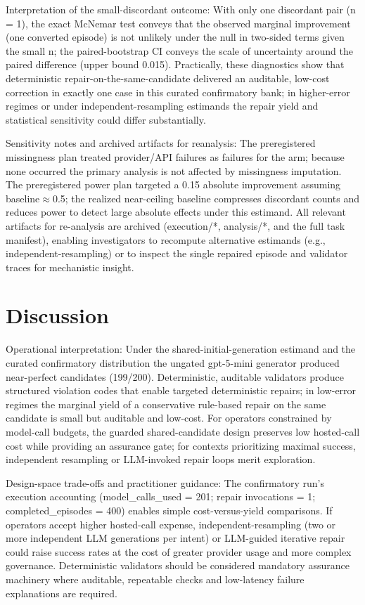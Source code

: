 \documentclass[conference]{IEEEtran}
\begin{document}
Interpretation of the small-discordant outcome: With only one discordant pair (n = 1), the exact McNemar test conveys that the observed marginal improvement (one converted episode) is not unlikely under the null in two-sided terms given the small n; the paired-bootstrap CI conveys the scale of uncertainty around the paired difference (upper bound 0.015). Practically, these diagnostics show that deterministic repair-on-the-same-candidate delivered an auditable, low-cost correction in exactly one case in this curated confirmatory bank; in higher-error regimes or under independent-resampling estimands the repair yield and statistical sensitivity could differ substantially.

Sensitivity notes and archived artifacts for reanalysis: The preregistered missingness plan treated provider/API failures as failures for the arm; because none occurred the primary analysis is not affected by missingness imputation. The preregistered power plan targeted a 0.15 absolute improvement assuming baseline\ensuremath{\approx}0.5; the realized near-ceiling baseline compresses discordant counts and reduces power to detect large absolute effects under this estimand. All relevant artifacts for re-analysis are archived (execution/*, analysis/*, and the full task manifest), enabling investigators to recompute alternative estimands (e.g., independent-resampling) or to inspect the single repaired episode and validator traces for mechanistic insight.

\section{Discussion}
Operational interpretation: Under the shared-initial-generation estimand and the curated confirmatory distribution the ungated gpt-5-mini generator produced near-perfect candidates (199/200). Deterministic, auditable validators produce structured violation codes that enable targeted deterministic repairs; in low-error regimes the marginal yield of a conservative rule-based repair on the same candidate is small but auditable and low-cost. For operators constrained by model-call budgets, the guarded shared-candidate design preserves low hosted-call cost while providing an assurance gate; for contexts prioritizing maximal success, independent resampling or LLM-invoked repair loops merit exploration.

Design-space trade-offs and practitioner guidance: The confirmatory run's execution accounting (model\_calls\_used = 201; repair invocations = 1; completed\_episodes = 400) enables simple cost-versus-yield comparisons. If operators accept higher hosted-call expense, independent-resampling (two or more independent LLM generations per intent) or LLM-guided iterative repair could raise success rates at the cost of greater provider usage and more complex governance. Deterministic validators should be considered mandatory assurance machinery where auditable, repeatable checks and low-latency failure explanations are required.
\end{document}
